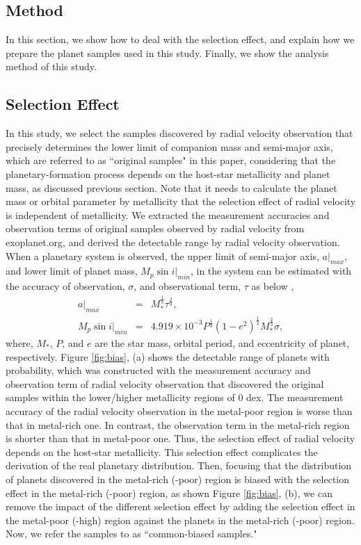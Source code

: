 \documentclass[twocolumn, dvipdfmx]{aastex62}
\begin{document}
\begin{CJK*}{UTF8}{min}
\section{Method} \label{sec:method}

In this section, we show how to deal with the selection effect, and explain how we prepare the planet samples used in this study. Finally, we show the analysis method of this study.


\subsection{Selection Effect} \label{subsec:selection}

In this study, we select the samples discovered by radial velocity observation that precisely determines the lower limit of companion mass and semi-major axis, which are referred to as ``original samples" in this paper, considering that the planetary-formation process depends on the host-star metallicity and planet mass, as discussed previous section. Note that it needs to calculate the planet mass or orbital parameter by metallicity that the selection effect of radial velocity is independent of metallicity. We extracted the measurement accuracies and observation terms of original samples observed by radial velocity from exoplanet.org, and derived the detectable range by radial velocity observation. When a planetary system is observed, the upper limit of semi-major axis, $a|_{max}$, and lower limit of planet mass, $M_p\sin i|_{min}$, in the system can be estimated with the accuracy of observation, $\sigma$, and observational term, $\tau$ as below \citep{2008ApJ...677.1324T},
\begin{eqnarray}
a|_{max} &=& M_{*}^{\frac{1}{3}}\tau^{\frac{2}{3}} , \\
\label{equ:Mp}
M_p\sin i|_{min} &=& 4.919\times10^{-3}P^{\frac{1}{3}}(1-e^2)^{\frac{1}{2}}M_{*}^{\frac{2}{3}}\sigma ,
\end{eqnarray}
where, $M_*$, $P$, and $e$ are the star mass, orbital period, and eccentricity of planet, respectively. Figure \ref{fig:bias}, (a) shows the detectable range of planets with probability, which was constructed with the measurement accuracy and observation term of radial velocity observation that discovered the original samples within the lower/higher metallicity regions of 0 dex. The measurement accuracy of the radial velocity observation in the metal-poor region is worse than that in metal-rich one. In contrast, the observation term in the metal-rich region is shorter than that in metal-poor one. Thus, the selection effect of radial velocity depends on the host-star metallicity. This selection effect complicates the derivation of the real planetary distribution. Then, focusing that the distribution of planets discovered in the metal-rich (-poor) region is biased with the selection effect in the metal-rich (-poor) region, as shown Figure \ref{fig:bias}, (b), we can remove the impact of the different selection effect by adding the selection effect in the metal-poor (-high) region against the planets in the metal-rich (-poor) region. Now, we refer the samples to as ``common-biased samples."


\end{CJK*}
\end{document}
